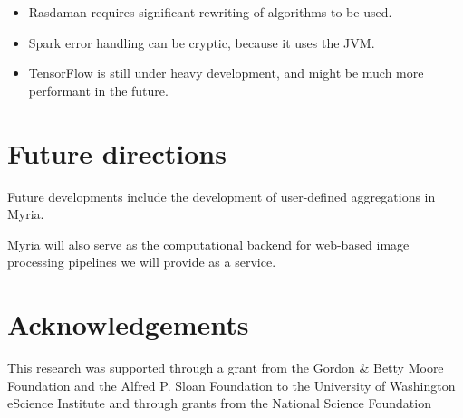 \documentclass[a0,landscape]{a0poster}
\begin{document}
\begin{multicols}{3}
\begin{itemize}
\item Rasdaman requires significant rewriting of algorithms to be used.

\item  Spark error handling can be cryptic, because it uses the JVM.

\item TensorFlow is still under heavy development, and might be much more performant in the future.

\end{itemize}

\color{DarkSlateGray} %


\section*{Future directions}

Future developments include the development of user-defined aggregations in Myria.

Myria will also serve as the computational backend for web-based image processing pipelines we will provide as a service.


\nocite{*} %
\small  %

\section*{Acknowledgements}

This research was supported through a grant from the Gordon \& Betty Moore
Foundation and the Alfred P. Sloan Foundation to the University of Washington
eScience Institute and through grants from the National Science Foundation


\end{multicols}
\end{document}
